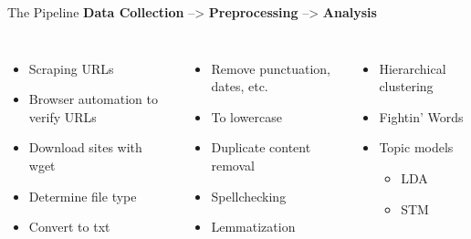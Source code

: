 \documentclass[12pt]{beamer}
\begin{document}
\begin{frame}{The Pipeline}
\textbf{Data Collection} \hspace{2mm} --> \hspace{2mm} \textbf{Preprocessing} \hspace{2mm} --> \hspace{2mm} \textbf{Analysis}
\begin{columns}
	\vspace{5mm}
	\begin{itemize}
		\item Scraping URLs
		\item Browser automation to verify URLs
		\item Download sites with wget
		\item Determine file type
		\item Convert to txt
	\end{itemize}		
	\vspace{5mm}
	\begin{itemize}
		\item Remove punctuation, dates, etc.
		\item To lowercase
		\item Duplicate content removal
		\item Spellchecking
		\item Lemmatization
	\end{itemize}
	\vspace{5mm}
	\begin{itemize}
		\item Hierarchical clustering
		\item Fightin' Words
		\item Topic models
		\begin{itemize}
			\item LDA
			\item STM
		\end{itemize}
	\end{itemize}
\end{columns}
\end{frame}

\end{document}
